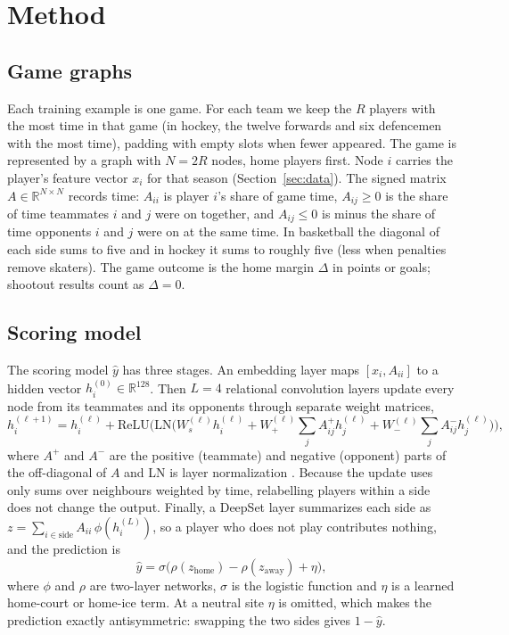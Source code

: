\section{Method}
\label{sec:method}

\subsection{Game graphs}
\label{sec:graph}
Each training example is one game. For each team we keep the $R$ players with the most time in that game (in hockey, the twelve forwards and six defencemen with the most time), padding with empty slots when fewer appeared. The game is represented by a graph with $N=2R$ nodes, home players first. Node $i$ carries the player's feature vector $x_i$ for that season (Section~\ref{sec:data}). The signed matrix $A\in\mathbb{R}^{N\times N}$ records time: $A_{ii}$ is player $i$'s share of game time, $A_{ij}\ge 0$ is the share of time teammates $i$ and $j$ were on together, and $A_{ij}\le 0$ is minus the share of time opponents $i$ and $j$ were on at the same time. In basketball the diagonal of each side sums to five and in hockey it sums to roughly five (less when penalties remove skaters). The game outcome is the home margin $\Delta$ in points or goals; shootout results count as $\Delta=0$.

\subsection{Scoring model}
\label{sec:model}
The scoring model $\hat{y}$ has three stages. An embedding layer maps $[x_i, A_{ii}]$ to a hidden vector $h_i^{(0)}\in\mathbb{R}^{128}$. Then $L=4$ relational convolution layers update every node from its teammates and its opponents through separate weight matrices,
\begin{equation}
h_i^{(\ell+1)}=h_i^{(\ell)}+\mathrm{ReLU}\Big(\mathrm{LN}\big(W_s^{(\ell)}h_i^{(\ell)}+W_+^{(\ell)}\textstyle\sum_{j}A^+_{ij}h_j^{(\ell)}+W_-^{(\ell)}\sum_{j}A^-_{ij}h_j^{(\ell)}\big)\Big),
\end{equation}
where $A^+$ and $A^-$ are the positive (teammate) and negative (opponent) parts of the off-diagonal of $A$ and LN is layer normalization \citep{schlichtkrull2018}. Because the update uses only sums over neighbours weighted by time, relabelling players within a side does not change the output. Finally, a DeepSet layer \citep{zaheer2017} summarizes each side as $z=\sum_{i\in\text{side}} A_{ii}\,\phi(h_i^{(L)})$, so a player who does not play contributes nothing, and the prediction is
\begin{equation}
\hat{y}=\sigma\big(\rho(z_{\text{home}})-\rho(z_{\text{away}})+\eta\big),
\end{equation}
where $\phi$ and $\rho$ are two-layer networks, $\sigma$ is the logistic function and $\eta$ is a learned home-court or home-ice term. At a neutral site $\eta$ is omitted, which makes the prediction exactly antisymmetric: swapping the two sides gives $1-\hat{y}$.

